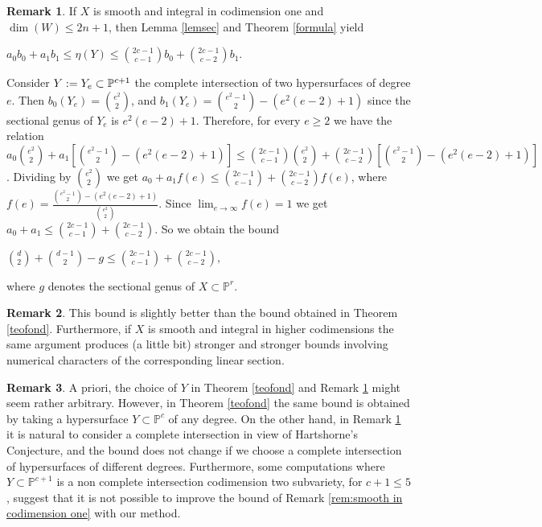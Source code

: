 \documentclass{amsart}
\theoremstyle{definition}
\newtheorem{remark}{Remark}
\begin{document}
\begin{remark}\label{rem:smooth in codimension one}
If $X$ is smooth and integral in codimension one and $\dim (W)\leq
2n+1$, then Lemma \ref{lemsec} and Theorem \ref{formula} yield
\begin{center}
$a_{0}b_{0}+a_{1}b_{1}\leq \eta (Y)\leq\binom{2c-1}{c-1}b_{0}+\binom{2c-1}{c-2}b_{1}$.
\end{center}
Consider $Y:=Y_e\subset\Bbb{P}^{c+1}$ the complete intersection of
two hypersurfaces of degree $e$. Then $b_0(Y_e)=\binom{e^2}{2}$, and
$b_1(Y_e)=\binom{e^2-1}{2}-(e^2(e-2)+1)$ since the sectional genus
of $Y_e$ is $e^2(e-2)+1$. Therefore, for every $e\geq 2$ we have the
relation
$a_{0}\binom{e^2}{2}+a_{1}[\binom{e^2-1}{2}-(e^2(e-2)+1)]\leq
\binom{2c-1}{c-1}\binom{e^2}{2}+\binom{2c-1}{c-2}[\binom{e^2-1}{2}-(e^2(e-2)+1)]$.
Dividing by $\binom{e^2}{2}$ we get $a_{0}+a_{1}f(e)\leq
\binom{2c-1}{c-1}+\binom{2c-1}{c-2}f(e)$, where
$f(e)=\frac{\binom{e^2-1}{2}-(e^2(e-2)+1)}{\binom{e^2}{2}}$. Since
$\lim_{e\to\infty}f(e)=1$ we get $a_{0}+a_{1}\leq
\binom{2c-1}{c-1}+\binom{2c-1}{c-2}$. So we obtain the bound
\begin{center}
$\binom{d}{2}+\binom{d-1}{2}-g\leq\binom{2c-1}{c-1}+\binom{2c-1}{c-2},$
\end{center}
where $g$ denotes the sectional genus of $X\subset{{\mathbb P}}^r$.
\end{remark}

\begin{remark}
This bound is slightly better than the bound obtained in
Theorem \ref{teofond}. Furthermore, if $X$ is smooth and integral in
higher codimensions the same argument produces (a little bit)
stronger and stronger bounds involving numerical characters of the
corresponding linear section.
\end{remark}

\begin{remark}
A priori, the choice of $Y$ in Theorem \ref{teofond} and Remark
\ref{rem:smooth in codimension one} might seem rather arbitrary.
However, in Theorem \ref{teofond} the same bound is obtained by
taking a hypersurface $Y\subset{{\mathbb P}}^c$ of any degree. On the other
hand, in Remark \ref{rem:smooth in codimension one} it is natural to
consider a complete intersection in view of Hartshorne's Conjecture,
and the bound does not change if we choose a complete intersection
of hypersurfaces of different degrees. Furthermore, some
computations where $Y\subset{{\mathbb P}}^{c+1}$ is a non complete intersection
codimension two subvariety, for $c+1\leq 5$, suggest that it is not
possible to improve the bound of Remark \ref{rem:smooth in
codimension one} with our method.
\end{remark}
\end{document}
